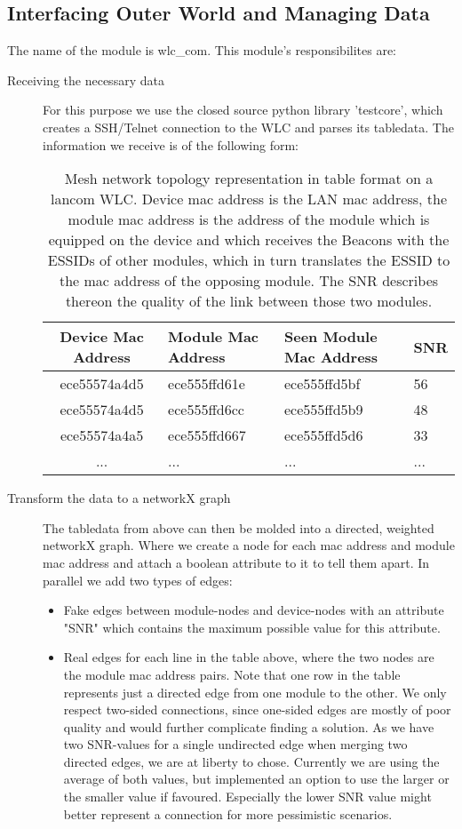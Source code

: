   \subsection{Interfacing Outer World and Managing Data}
  The name of the module is wlc_com. This module's responsibilites are:
  \begin{description}
   \item[Receiving the necessary data]
    For this purpose we use the closed source python library 'testcore', which creates a SSH/Telnet connection to the WLC and parses its tabledata.
    The information we receive is of the following form:
    \begin{table}[p]
      \begin{tabular}{clll}
	Device Mac Address & Module Mac Address & Seen Module Mac Address & \ac{SNR}\\ \hline
	ece55574a4d5 & ece555ffd61e & ece555ffd5bf & 56 \\
	ece55574a4d5 & ece555ffd6cc & ece555ffd5b9 & 48 \\
	ece55574a4a5 & ece555ffd667 & ece555ffd5d6 & 33 \\
	... & ... & ... & ...
      \end{tabular}
      \caption{Mesh network topology representation in table format on a lancom WLC. Device mac address is the LAN mac address, the module mac address is
      the address of the module which is equipped on the device and which receives the Beacons with the ESSIDs of other modules, which in turn translates
      the ESSID to the mac address of the opposing module. The \ac{SNR} describes thereon the quality of the link between those two modules.}
     \end{table}
    
    \item [Transform the data to a networkX graph]
      The tabledata from above can then be molded into a directed, weighted networkX graph. Where we create a node for each mac address and module mac address and attach a boolean
      attribute to it to tell them apart. 
      In parallel we add two types of edges:
    
      \begin{itemize}
	\item Fake edges between module-nodes and device-nodes with an attribute "SNR" which contains the maximum possible value for this attribute.
	
	\item Real edges for each line in the table above, where the two nodes are the module mac address pairs. 
	  Note that one row in the table represents just a directed edge from one module to the other. We only respect two-sided connections,
	  since one-sided edges are mostly of poor quality and would further complicate finding a solution.
	  As we have two SNR-values for a single undirected edge when merging two directed edges, we are at liberty to chose.
	  Currently we are using the average of both values, but implemented an option to use the larger or the smaller value if favoured.
	  Especially the lower SNR value might better represent a connection for more pessimistic scenarios.
      \end{itemize}
    

\end{description}

